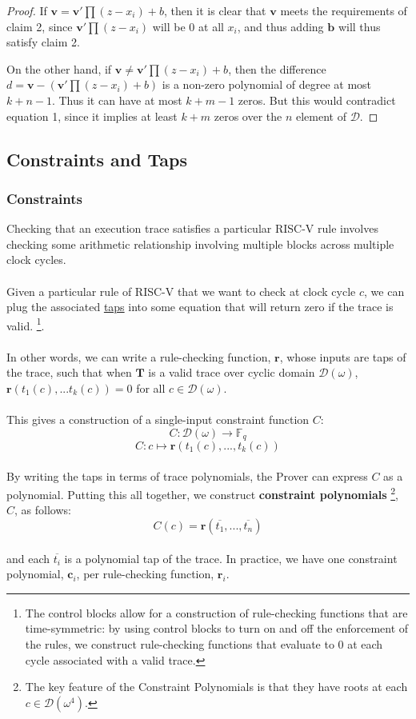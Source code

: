 \documentclass[10pt,letterpaper,titlepage]{article}
\newcommand{\GF}[1]{\mathbb{F}_{#1}}
\newcommand{\w}[0]{\omega}
\newcommand{\D}[0]{\mathcal{D}}
\theoremstyle{definition}
\begin{document}
\begin{appendices}
\begin{proof}
  If $\mathbf{v} = \mathbf{v'} \prod (z - x_i) + b$, then it is clear that $\mathbf{v}$ meets the requirements of claim 2, since $\mathbf{v'} \prod (z - x_i)$ will be 0 at all $x_i$, and thus adding $\mathbf{b}$ will thus satisfy claim 2.

  On the other hand, if $\mathbf{v} \ne \mathbf{v'} \prod (z - x_i) + b$, then the difference $d = \mathbf{v} - (\mathbf{v'} \prod (z - x_i) + b)$ is a non-zero polynomial of degree at most $k + n - 1$. 
  Thus it can have at most $k + m - 1$ zeros.  
  But this would contradict equation 1, since it implies at least $k + m$ zeros over the $n$ element of $\D$.
\end{proof}

\subsection{Constraints and Taps}
\subsubsection{Constraints}
\label{constructing constraint polynomials}
Checking that an execution trace satisfies a particular RISC-V rule involves checking some arithmetic relationship involving multiple blocks across multiple clock cycles. \\
\\
Given a particular rule of RISC-V that we want to check at clock cycle $c$, we can plug the associated \hyperref[taps]{taps} into some equation that will return zero if the trace is valid.%
\footnote{The control blocks allow for a construction of rule-checking functions that are time-symmetric: by using control blocks to turn on and off the enforcement of the rules, we construct rule-checking functions that evaluate to 0 at each cycle associated with a valid trace.}. \\
\\
In other words, we can write a rule-checking function, $\mathbf{r}$, whose inputs are taps of the trace, such that when $\mathbf{T}$ is a valid trace over cyclic domain $\D(\w)$, $\mathbf{r}(t_1(c),...t_k(c))=0$ for all $c\in\D(\w)$. \\
\\
This gives a construction of a single-input constraint function $C$: 
\[C:\D(\w)\to\GF{q}\]
\[C:c\mapsto \mathbf{r}(t_1(c),...,t_k(c))\]
\\
By writing the taps in terms of trace polynomials, the Prover can express $C$ as a polynomial. 
Putting this all together, we construct \textbf{constraint polynomials}%
\footnote{The key feature of the Constraint Polynomials is that they have roots at each $c\in\D(\w^4)$.}, $C$, as follows:
\[C(c)=\mathbf{r}(\overline{t_1},...,\overline{t_n})\]
\\
and each $\overline{t_i}$ is a polynomial tap of the trace. In practice, we have one constraint polynomial, $\mathbf{c}_i$, per rule-checking function, $\mathbf{r}_i$.


\end{appendices}
\end{document}
